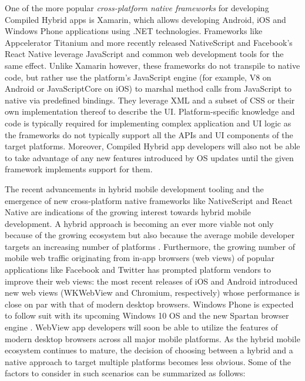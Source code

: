 \documentclass[thesis.tex]{subfiles}
\begin{document}
One of the more popular \textit{cross-platform native frameworks} for developing Compiled Hybrid apps is Xamarin, which allows developing Android, iOS and Windows Phone applications using .NET technologies. Frameworks like Appcelerator Titanium and more recently released NativeScript and Facebook's React Native leverage JavaScript and common web development tools for the same effect. Unlike Xamarin however, these frameworks do not transpile to native code, but rather use the platform's JavaScript engine (for example, V8 on Android or JavaScriptCore on iOS) to marshal method calls from JavaScript to native via predefined bindings. They leverage XML and a subset of CSS or their own implementation thereof to describe the UI. Platform-specific knowledge and code is typically required for implementing complex application and UI logic as the frameworks do not typically support all the APIs and UI components of the target platforms. Moreover, Compiled Hybrid app developers will also not be able to take advantage of any new features introduced by OS updates until the given framework implements support for them.

The recent advancements in hybrid mobile development tooling and the emergence of new cross-platform native frameworks like NativeScript and React Native are indications of the growing interest towards hybrid mobile development. A hybrid approach is becoming an ever more viable not only because of the growing ecosystem but also because the average mobile developer targets an increasing number of platforms \cite{two_platforms}. Furthermore, the growing number of mobile web traffic originating from in-app browsers (web views) of popular applications like Facebook and Twitter has prompted platform vendors to improve their web views: the most recent releases of iOS and Android introduced new web views (WKWebView and Chromium, respectively) whose performance is close on par with that of modern desktop browsers. \cite{souders_webview} Windows Phone is expected to follow suit with its upcoming Windows 10 OS and the new Spartan browser engine \cite{spartan}. WebView app developers will soon be able to utilize the features of modern desktop browsers across all major mobile platforms. As the hybrid mobile ecosystem continues to mature, the decision of choosing between a hybrid and a native approach to target multiple platforms becomes less obvious. Some of the factors to consider in such scenarios can be summarized as follows:
\end{document}
